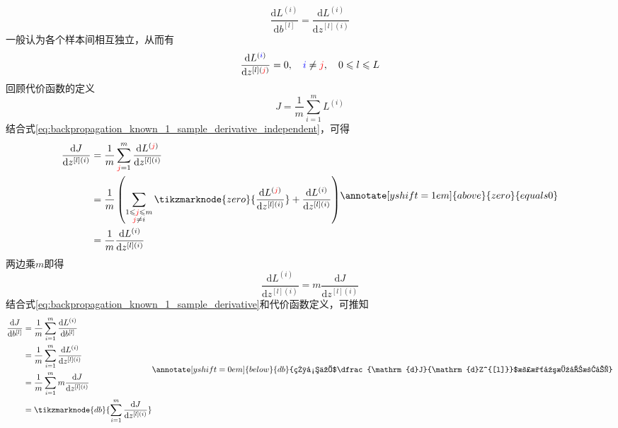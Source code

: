 \begin{equation}
	\frac{\mathrm{d}L^{(i)}}{\mathrm{d}b^{[l]}} = \frac{\mathrm{d}L^{(i)}}{\mathrm{d}z^{[l](i)}}
	\label{eq:backpropagation_known_1_sample_derivative}
\end{equation}
一般认为各个样本间相互独立，从而有
\begin{equation}
	\frac{\mathrm{d}L^{(\textcolor{blue}{i})}}{\mathrm{d}z^{[l](\textcolor{red}{j})}}=0
	, \quad \textcolor{blue}{i} \neq \textcolor{red}{j}, \quad 0 \leqslant l \leqslant L
	\label{eq:backpropagation_known_1_sample_derivative_independent}
\end{equation}
回顾代价函数的定义
\begin{equation}
	J = \frac{1}{m} \sum_{i=1}^{m} L^{(i)}
\end{equation}
结合式\eqref{eq:backpropagation_known_1_sample_derivative_independent}，可得
\begin{equation}
	\begin{aligned}
		\frac{\mathrm{d}J}{\mathrm{d}z^{[l](i)}} 
		&= \frac{1}{m}  \sum_{\textcolor{red}{j}=1}^{m} \frac{\mathrm{d}L^{(\textcolor{red}{j})}}{\mathrm{d}z^{[l](i)}} \\
		&= \frac{1}{m}  \left( \sum_{\substack{1 \leqslant \textcolor{red}{j} \leqslant m \\ \textcolor{red}{j} \neq i}} \tikzmarknode{zero}{\frac{\mathrm{d}L^{(\textcolor{red}{j})}}{\mathrm{d}z^{[l](i)}}} + \frac{\mathrm{d}L^{(i)}}{\mathrm{d}z^{[l](i)}} \right) \\
		&= \frac{1}{m} \frac{\mathrm{d}L^{(i)}}{\mathrm{d}z^{[l](i)}} \\
	\end{aligned}
	\annotate[yshift=1em]{above}{zero}{equals 0}
\end{equation}
两边乘$m$即得
\begin{equation}
	\frac{\mathrm{d}L^{(i)}}{\mathrm{d}z^{[l](i)}} = m \frac{\mathrm{d}J}{\mathrm{d}z^{[l](i)}}
\end{equation}
结合式\eqref{eq:backpropagation_known_1_sample_derivative}和代价函数定义，可推知
\begin{equation}
	\begin{aligned}
		\frac{\mathrm{d}J}{\mathrm{d}b^{[l]}} 
		&= \frac{1}{m} \sum_{i=1}^{m} \frac{\mathrm{d}L^{(i)}}{\mathrm{d}b^{[l]}} \\
		&= \frac{1}{m} \sum_{i=1}^{m} \frac{\mathrm{d}L^{(i)}}{\mathrm{d}z^{[l](i)}} \\
		&= \frac{1}{m} \sum_{i=1}^{m} m \frac{\mathrm{d}J}{\mathrm{d}z^{[l](i)}} \\
		&= \tikzmarknode{db}{\sum_{i=1}^{m} \frac{\mathrm{d}J}{\mathrm{d}z^{[l](i)}}}
	\label{eq:backpropagation_conc_4}
	\end{aligned}
	\vspace{2em}
	\annotate[yshift=0em]{below}{db}{相当于$\dfrac{\mathrm{d}J}{\mathrm{d}Z^{[l]}}$沿水平方向求和}
\end{equation}
